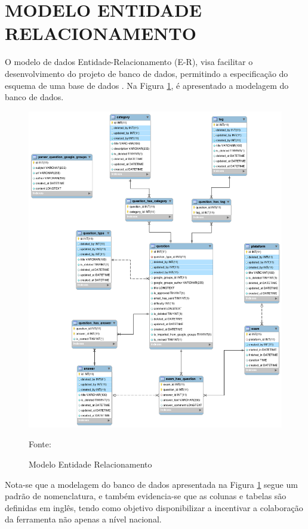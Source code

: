 \section{MODELO ENTIDADE RELACIONAMENTO}

O modelo de dados Entidade-Relacionamento (E-R), visa facilitar o
desenvolvimento do projeto de banco de dados, permitindo a
especificação do esquema de uma base de dados \cite{sistemaDeBancoDeDados}. Na 
Figura \ref{fig:modeloEntidadeRelacionamento}, é apresentado a modelagem do 
banco de dados.

\begin{figure}[h!tb]
	\caption{Modelo Entidade Relacionamento}
	\label{fig:modeloEntidadeRelacionamento}

	\centering
	\includegraphics[width=\textwidth]{images/zcpe-reverse-engineer-database.png}

	\centering
	\footnotesize Fonte: \fonteOAutor
\end{figure}

\FloatBarrier 	%
				
Nota-se que a modelagem do banco de dados apresentada na Figura
\ref{fig:modeloEntidadeRelacionamento} segue um padrão de nomenclatura, e também
evidencia-se que as colunas e tabelas são definidas em inglês, tendo como
objetivo disponibilizar a incentivar a colaboração da ferramenta não apenas a 
nível nacional.
